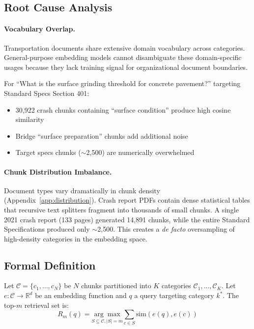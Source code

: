 \documentclass{article}
\begin{document}
\subsection{Root Cause Analysis}

\paragraph{Vocabulary Overlap.} Transportation documents share extensive domain vocabulary across categories. 
General-purpose embedding models \cite{reimers2019sentencebert, wang2024e5mistral} cannot disambiguate these domain-specific usages because they lack training signal for organizational document boundaries.

For ``What is the surface grinding threshold for concrete pavement?'' targeting Standard Specs Section 401:
\begin{itemize}[leftmargin=*,topsep=2pt,itemsep=1pt]
    \item 30,922 crash chunks containing ``surface condition'' produce high cosine similarity
    \item Bridge ``surface preparation'' chunks add additional noise
    \item Target specs chunks ($\sim$2,500) are numerically overwhelmed
\end{itemize}

\paragraph{Chunk Distribution Imbalance.} Document types vary dramatically in chunk density (Appendix~\ref{app:distribution}). Crash report PDFs contain dense statistical tables that recursive text splitters \cite{langchain2024recursive} fragment into thousands of small chunks. A single 2021 crash report (133 pages) generated 14,891 chunks, while the entire Standard Specifications produced only $\sim$2,500. This creates a \textit{de facto} oversampling of high-density categories in the embedding space.

\subsection{Formal Definition}

Let $\mathcal{C} = \{c_1, \ldots, c_N\}$ be $N$ chunks partitioned into $K$ categories $\mathcal{C}_1, \ldots, \mathcal{C}_K$. Let $e: \mathcal{C} \rightarrow \mathbb{R}^d$ be an embedding function and $q$ a query targeting category $k^*$. The top-$m$ retrieval set is:
\begin{equation}
R_m(q) = \underset{S \subseteq \mathcal{C}, |S|=m}{\arg\max} \sum_{c \in S} \text{sim}(e(q), e(c))
\end{equation}
\end{document}
